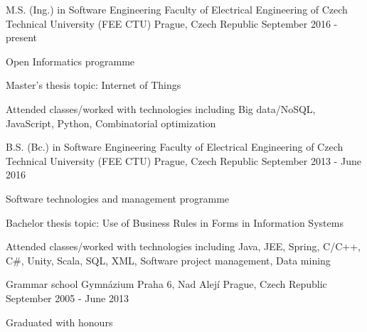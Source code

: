 \begin{cventries}
        \cventry
            {M.S. (Ing.) in Software Engineering}
            {Faculty of Electrical Engineering of Czech Technical University (FEE CTU)}
            {Prague, Czech Republic}
            {September 2016 - present}
            {
              \begin{cvitems}
                \item {Open Informatics programme}
                \item {Master's thesis topic: Internet of Things}
                \item {Attended classes/worked with technologies including Big data/NoSQL, JavaScript, Python, Combinatorial optimization}
              \end{cvitems}
            }
        \cventry
                {B.S. (Bc.) in Software Engineering}
                {Faculty of Electrical Engineering of Czech Technical University (FEE CTU)}
                {Prague, Czech Republic}
                {September 2013 - June 2016}
                {
                  \begin{cvitems}
                    \item {Software technologies and management programme}
                    \item {Bachelor thesis topic: Use of Business Rules in Forms in Information Systems}
                    \item {Attended classes/worked with technologies including Java, JEE, Spring, C/C++, C\#, Unity, Scala, SQL, XML, Software project management, Data mining}
                  \end{cvitems}
                }
        \cventry
                {Grammar school}
                {Gymn\'{a}zium Praha 6, Nad Alej\'{i}}
                {Prague, Czech Republic}
                {September 2005 - June 2013}
                {
                  \begin{cvitems}
                    \item {Graduated with honours}
                  \end{cvitems}
                }
\end{cventries}

